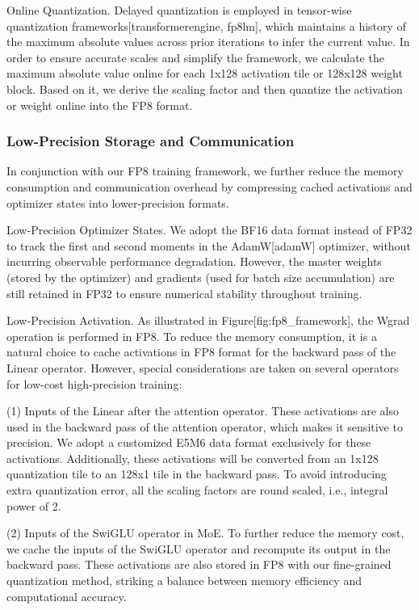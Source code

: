 \documentclass[11pt,a4paper]{article}
\begin{document}
Online Quantization.
Delayed quantization is employed in tensor-wise quantization frameworks[transformerengine, fp8lm], which maintains a history of the maximum absolute values across prior iterations to infer the current value. 
In order to ensure accurate scales and simplify the framework, we calculate the maximum absolute value online for each 1x128 activation tile or 128x128 weight block. 
Based on it, we derive the scaling factor and then quantize the activation or weight online into the FP8 format.

\subsubsection{Low-Precision Storage and Communication}

In conjunction with our FP8 training framework, we further reduce the memory consumption and communication overhead by compressing cached activations and optimizer states into lower-precision formats.

Low-Precision Optimizer States.
We adopt the BF16 data format instead of FP32 to track the first and second moments in the AdamW[adamW] optimizer, without incurring observable performance degradation. 
However, the master weights (stored by the optimizer) and gradients (used for batch size accumulation) are still retained in FP32 to ensure numerical stability throughout training.

Low-Precision Activation.
As illustrated in Figure[fig:fp8\_framework], the Wgrad operation is performed in FP8. 
To reduce the memory consumption, it is a natural choice to cache activations in FP8 format for the backward pass of the Linear operator.
However, special considerations are taken on several operators for low-cost high-precision training:

(1) Inputs of the Linear after the attention operator. These activations are also used in the backward pass of the attention operator, which makes it sensitive to precision. We adopt a customized E5M6 data format exclusively for these activations. Additionally, these activations will be converted from an 1x128 quantization tile to an 128x1 tile in the backward pass. To avoid introducing extra quantization error, all the scaling factors are round scaled, i.e., integral power of 2.

(2) Inputs of the SwiGLU operator in MoE. To further reduce the memory cost, we cache the inputs of the SwiGLU operator and recompute its output in the backward pass. These activations are also stored in FP8 with our fine-grained quantization method, striking a balance between memory efficiency and computational accuracy.
\end{document}
